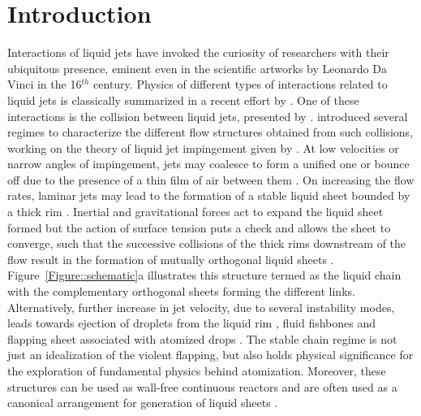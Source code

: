 \documentclass{jfm}
\begin{document}
\section{Introduction}
Interactions of liquid jets have invoked the curiosity of researchers with their ubiquitous presence, eminent even in the scientific artworks by Leonardo Da Vinci in the 16$^{th}$ century. Physics of different types of interactions related to liquid jets is classically summarized in a recent effort by \cite{eggers2008physics}. One of these interactions is the collision between liquid jets, presented by \cite{rayleigh1879capillary}. \cite{bush2004collision} introduced several regimes to characterize the different flow structures obtained from such collisions, working on the theory of liquid jet impingement given by \cite{taylor1960formation}. At low velocities or narrow angles of impingement, jets may coalesce to form a unified one or bounce off due to the presence of a thin film of air between them \citep{wadhwa2013noncoalescence}. On increasing the flow rates, laminar jets may lead to the formation of a stable liquid sheet bounded by a thick rim \citep{yang2014liquid}. Inertial and gravitational forces act to expand the liquid sheet formed but the action of surface tension puts a check and allows the sheet to converge, such that the successive collisions of the thick rims downstream of the flow result in the formation of mutually orthogonal liquid sheets \citep{bush2004collision}. Figure~\ref{Figure::schematic}a illustrates this structure termed as the liquid chain with the complementary orthogonal sheets forming the different links. Alternatively, further increase in jet velocity, due to several instability modes, leads towards ejection of droplets from the liquid rim \citep{bremond2006atomization}, fluid fishbones \citep{bush2004collision} and flapping sheet \citep{villermaux2002life} associated with atomized drops \citep{ibrahim1991impinging}. The stable chain regime is not just an idealization of the violent flapping, but also holds physical significance for the exploration of fundamental physics behind atomization. Moreover, these structures can be used as wall-free continuous reactors \citep{erni2013free} and are often used as a canonical arrangement for generation of liquid sheets \citep{bush2004collision,taylor1960formation}.\\
\end{document}
